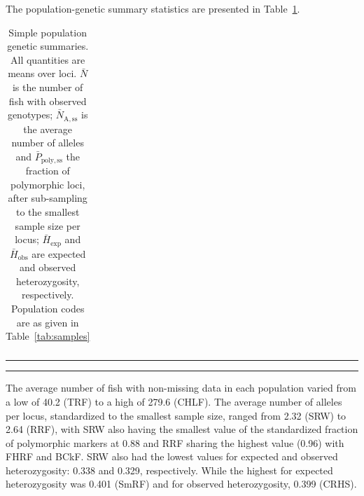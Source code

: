 The population-genetic summary statistics are presented in Table~\ref{tab:pg-summ}.
\begin{table}
\caption{\footnotesize Simple population genetic summaries. All quantities are means
over loci.  $\bar{N}$ is the number of fish with observed genotypes; $\bar{N}_\mathrm{A,ss}$ is the
average number of alleles and $\bar{P}_\mathrm{poly,ss}$ the fraction of polymorphic loci,
after sub-sampling to the smallest sample size per locus; $\bar{H}_\mathrm{exp}$ and
$\bar{H}_\mathrm{obs}$ are expected and observed heterozygosity, respectively. Population
codes are as given in Table~\ref{tab:samples}}
\label{tab:pg-summ}
{\footnotesize
\begin{tabular*}{\columnwidth}{@{\extracolsep{\fill}} lrrrrr}
\hline\hline

\end{tabular*}
}
\vspace*{-2.3ex}\hrule\vspace*{0.3ex}\hrule
\end{table}
The average number of fish with non-missing data in each population varied from
a low of 40.2 (TRF) to a high of 279.6 (CHLF).  The average number of alleles
per locus, standardized to the smallest sample size, ranged from 2.32 (SRW) to
2.64 (RRF), with  SRW also having the smallest value of the
standardized fraction of polymorphic markers at 0.88 and RRF sharing the highest value
(0.96) with FHRF and BCkF.
SRW also had the lowest values for expected and observed heterozygosity:
0.338 and 0.329, respectively. While the highest for expected heterozygosity
was 0.401 (SmRF) and for observed heterozygosity, 0.399 (CRHS).

